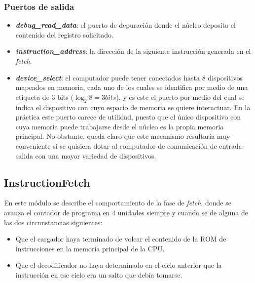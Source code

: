 \subsubsection{Puertos de salida}
\begin{itemize}
  \item \textbf{\textit{debug\_read\_data}}: el puerto de depuración donde el núcleo deposita el contenido del registro solicitado.
  \vspace{-0.2cm}
  \item \textbf{\textit{instruction\_address}}: la dirección de la siguiente instrucción generada en el \textit{fetch}.
  \vspace{-0.2cm}
  \item \textbf{\textit{device\_select}}: el computador puede tener conectados hasta 8 dispositivos mapeados en memoria, cada uno de los cuales se identifica por medio de una etiqueta de 3 bits ($\log_2 8 = 3 bits$), y es este el puerto por medio del cual se indica el dispositivo con cuyo espacio de memoria se quiere interactuar. En la práctica este puerto carece de utilidad, puesto que el único dispositivo con cuya memoria puede trabajarse desde el núcleo es la propia memoria principal. No obstante, queda claro que este mecanismo resultaría muy conveniente si se quisiera dotar al computador de comunicación de entrada-salida con una mayor variedad de dispositivos.
\end{itemize}

\subsection{InstructionFetch}

En este módulo se describe el comportamiento de la fase de \textit{fetch}, donde se avanza el contador de programa en 4 unidades siempre y cuando se de alguna de las dos circunstancias siguientes:

\begin{itemize}
  \item Que el cargador haya terminado de volcar el contenido de la ROM de instrucciones en la memoria principal de la CPU.
  \vspace{-0.2cm}
  \item Que el decodificador no haya determinado en el ciclo anterior que la instrucción en ese ciclo era un salto que debía tomarse.
\end{itemize}


